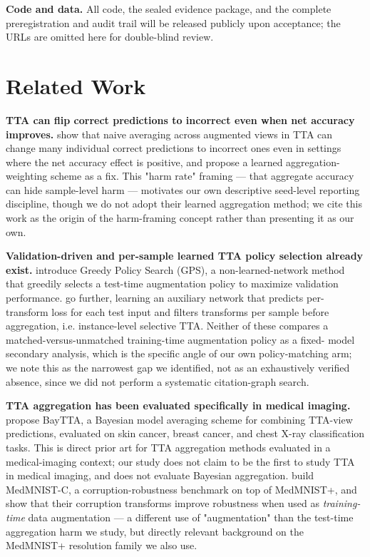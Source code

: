 \textbf{Code and data.} All code, the sealed evidence package, and the complete preregistration and audit trail will be released publicly upon acceptance; the URLs are omitted here for double-blind review.

\section{Related Work}

\textbf{TTA can flip correct predictions to incorrect even when net accuracy improves.} \citet{shanmugam2021better} show that naive averaging across augmented views in TTA can change many individual correct predictions to incorrect ones even in settings where the net accuracy effect is positive, and propose a learned aggregation-weighting scheme as a fix. This "harm rate" framing --- that aggregate accuracy can hide sample-level harm --- motivates our own descriptive seed-level reporting discipline, though we do not adopt their learned aggregation method; we cite this work as the origin of the harm-framing concept rather than presenting it as our own.

\textbf{Validation-driven and per-sample learned TTA policy selection already exist.} \citet{lyzhov2020greedy} introduce Greedy Policy Search (GPS), a non-learned-network method that greedily selects a test-time augmentation policy to maximize validation performance. \citet{kim2020learning} go further, learning an auxiliary network that predicts per-transform loss for each test input and filters transforms per sample before aggregation, i.e. instance-level selective TTA. Neither of these compares a matched-versus-unmatched training-time augmentation policy as a fixed- model secondary analysis, which is the specific angle of our own policy-matching arm; we note this as the narrowest gap we identified, not as an exhaustively verified absence, since we did not perform a systematic citation-graph search.

\textbf{TTA aggregation has been evaluated specifically in medical imaging.} \citet{sherkatghanad2024baytta} propose BayTTA, a Bayesian model averaging scheme for combining TTA-view predictions, evaluated on skin cancer, breast cancer, and chest X-ray classification tasks. This is direct prior art for TTA aggregation methods evaluated in a medical-imaging context; our study does not claim to be the first to study TTA in medical imaging, and does not evaluate Bayesian aggregation. \citet{disalvo2024medmnistc} build MedMNIST-C, a corruption-robustness benchmark on top of MedMNIST+, and show that their corruption transforms improve robustness when used as \emph{training-time} data augmentation --- a different use of "augmentation" than the test-time aggregation harm we study, but directly relevant background on the MedMNIST+ resolution family we also use.

